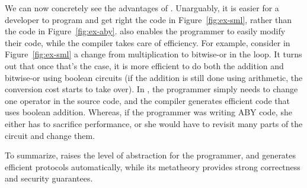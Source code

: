 We can now concretely see the advantages of \tool. Unarguably, it is
easier for a developer to program and get right the code in
Figure~\ref{fig:ex-sml}, rather than the code in
Figure~\ref{fig:ex-aby}.
\tool also enables the
programmer to easily modify their code, while the compiler takes care
of efficiency. For example, consider in Figure~\ref{fig:ex-sml} a
change from multiplication to bitwise-or in the  loop. It
turns out that once that's the case, it is more efficient to do both
the addition and bitwise-or using boolean circuits (if the addition is
still done using arithmetic, the conversion cost starts to take
over). In \tool, the programmer simply needs to change one operator in
the source code, and the compiler generates efficient code that uses
boolean addition. Whereas, if the programmer was writing ABY
code, she either has to sacrifice performance, or she would have to
revisit many parts of the circuit and change them.

To summarize, \tool raises the level of abstraction for the
programmer, and generates efficient \mpc protocols automatically,
while its metatheory provides strong correctness and security
guarantees. 




